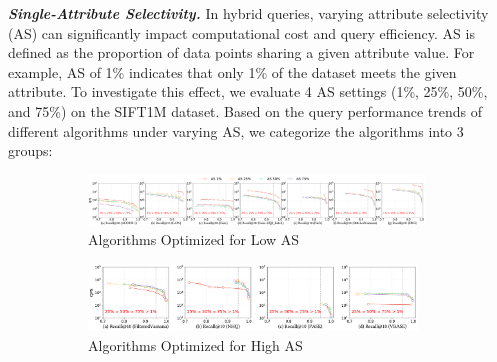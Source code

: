\documentclass[sigconf, nonacm]{acmart}
\begin{document}
{	\textit{\textbf{Single-Attribute Selectivity.}}
	In hybrid queries, varying attribute selectivity (AS) can significantly impact computational cost and query efficiency.
	AS is defined as the proportion of data points sharing a given attribute value. For example, AS of 1\% indicates that only 1\% of the dataset meets the given attribute. 
	To investigate this effect, we evaluate 4 AS settings (1\%, 25\%, 50\%, and 75\%) on the SIFT1M dataset. 
	Based on the query performance trends of different algorithms under varying AS, we categorize the algorithms into 3 groups:
%	
	
	
	
	
	\begin{figure}
		\centering
		
		\begin{subfigure}{\textwidth}
			\centering
			
			\includegraphics[width=0.98\textwidth]{figures/exp/exp_5_2_1.pdf}
			\caption{Algorithms Optimized for Low AS}
			\label{fig:exp_5_2_1}
		\end{subfigure}
		
		\vfill %
		
		\begin{subfigure}{0.64\textwidth} %
			\centering
			
			\includegraphics[width=0.96\textwidth]{figures/exp/exp_5_2_2.pdf}
			\caption{Algorithms Optimized for High AS}
			\label{fig:exp_5_2_2}
		\end{subfigure}
		\hspace{1mm} %
		\begin{subfigure}{0.34\textwidth} %
			\centering
			

\end{subfigure}
\end{figure}}
\end{document}
